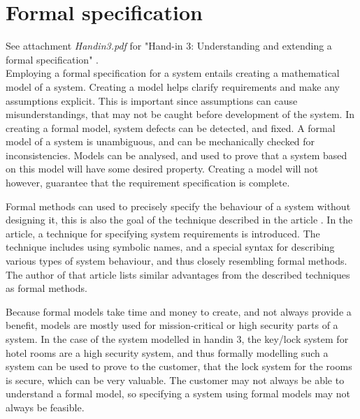 \documentclass[Main]{subfiles}
\begin{document}
\section{Formal specification}

See attachment \textit{Handin3.pdf} for "Hand-in 3: Understanding and extending a formal specification" \parencite[]{HI3}.
\\


Employing a formal specification for a system entails creating a mathematical model of a system. Creating a model helps clarify requirements and make any assumptions explicit. This is important since assumptions can cause misunderstandings, that may not be caught before development of the system. In creating a formal model, system defects can be detected, and fixed. A formal model of a system is unambiguous, and can be mechanically checked for inconsistencies. Models can be analysed, and used to prove that a system based on this model will have some desired property. Creating a model will not however, guarantee that the requirement specification is complete.

Formal methods can used to precisely specify the behaviour of a system without designing it, this is also the goal of the technique described in the article \parencite[]{Specifying}. In the article, a technique for specifying system requirements is introduced. The technique includes using symbolic names, and a special syntax for describing various types of system behaviour, and thus closely resembling formal methods. The author of that article lists similar advantages from the described techniques as formal methods. 

Because formal models take time and money to create, and not always provide a benefit, models are mostly used for mission-critical or high security parts of a system. In the case of the system modelled in handin 3\parencite[1-5]{HI3}, the key/lock system for hotel rooms are a high security system, and thus formally modelling such a system can be used to prove to the customer, that the lock system for the rooms is secure, which can be very valuable. The customer may not always be able to understand a formal model, so specifying a system using formal models may not always be feasible.
\end{document}
